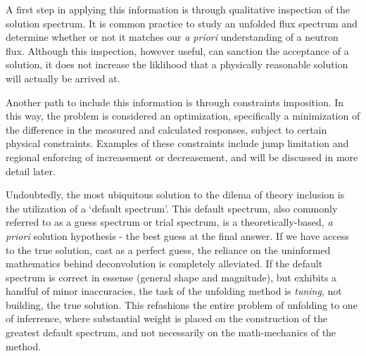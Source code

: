 A first step in applying this information is through qualitative inspection of the solution spectrum.
It is common practice to study an unfolded flux spectrum and determine whether or not it matches our {\it a priori} understanding of a neutron flux.
Although this inspection, however useful, can sanction the acceptance of a solution, it does not increase the liklihood that a physically reasonable solution will actually be arrived at.

Another path to include this information is through constraints imposition.
In this way, the problem is considered an optimization, specifically a minimization of the difference in the measured and calculated responses, subject to certain physical constraints.
Examples of these constraints include jump limitation and regional enforcing of increasement or decreasement, and will be discussed in more detail later.

Undoubtedly, the most ubiquitous solution to the dilema of theory inclusion is the utilization of a `default spectrum'.
This default spectrum, also commonly referred to as a guess spectrum or trial spectrum, is a theoretically-based, {\it a priori} solution hypothesis - the best guess at the final answer.
If we have access to the true solution, cast as a perfect guess, the reliance on the uninformed mathematics behind deconvolution is completely alleviated.
If the default spectrum is correct in essense (general shape and magnitude), but exhibits a handful of minor inaccuracies, the task of the unfolding method is {\it tuning}, not building, the true solution.
This refashions the entire problem of unfolding to one of inferrence, where substantial weight is placed on the construction of the greatest default spectrum, and not necessarily on the math-mechanics of the method.

